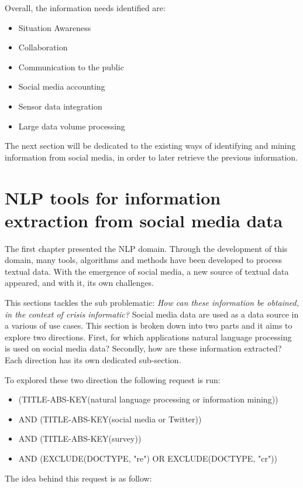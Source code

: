 Overall, the information needs identified are:

\begin{itemize}
    \item Situation Awareness
    \item Collaboration
    \item Communication to the public
    \item Social media accounting
    \item Sensor data integration
    \item Large data volume processing
\end{itemize}

The next section will be dedicated to the existing ways of identifying and mining information from social media, in order to later retrieve the previous information.

\section{NLP tools for information extraction from social media data}
The first chapter presented the NLP domain.
Through the development of this domain, many tools, algorithms and methods have been developed to process textual data.
With the emergence of social media, a new source of textual data appeared, and with it, its own challenges.

This sections tackles the sub problematic: \emph{How can these information be obtained, in the context of crisis informatic?}
Social media data are used as a data source in a various of use cases.
This section is broken down into two parts and it aims to explore two directions.
First, for which applications natural language processing is used on social media data?
Secondly, how are these information extracted?
Each direction has its own dedicated sub-section.

To explored these two direction the following request is run:

\begin{itemize}
    \item (TITLE-ABS-KEY({natural language processing} or {information mining}))
    \item AND (TITLE-ABS-KEY({social media} or Twitter))
    \item AND (TITLE-ABS-KEY(survey))
    \item AND (EXCLUDE(DOCTYPE, "re") OR EXCLUDE(DOCTYPE, "cr"))
\end{itemize}

The idea behind this request is as follow:


